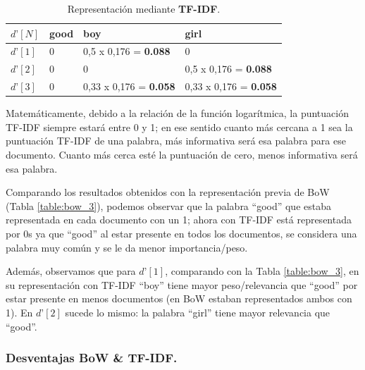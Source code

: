 \documentclass[12pt,a4paper]{article}
\begin{document}
\begin{sloppypar}
\begin{table}[h!]
\centering
\begin{tabular}{|p{1cm}||p{1cm}|p{4cm}|p{4cm}|}
\hline
\centering $d’[N]$ & \textbf{good} & \textbf{boy} & \textbf{girl}  \\ [1ex] 
\hline
$d’[1]$ & 0 & 0,5 x 0,176 = \textbf{0.088} & 0  \\
\hline
$d’[2]$ & 0 & 0 & 0,5 x 0,176 = \textbf{0.088}  \\
\hline
$d’[3]$ & 0 & 0,33 x 0,176 = \textbf{0.058} & 0,33 x 0,176 = \textbf{0.058}  \\
\hline
\end{tabular}
\caption{Representación mediante \textbf{TF-IDF}\cite{NLP_2}.} 
\label{table:tf_idf_3}
\end{table}

Matemáticamente, debido a la relación de la función logarítmica, la puntuación TF-IDF siempre estará entre 0 y 1; en ese sentido cuanto más cercana a 1 sea la puntuación TF-IDF de una palabra, más informativa será esa palabra para ese documento. Cuanto más cerca esté la puntuación de cero, menos informativa será esa palabra\cite{NLP_7}.

Comparando los resultados obtenidos con la representación previa de BoW (Tabla \ref{table:bow_3}), podemos observar que la palabra “good” que estaba representada en cada documento con un 1; ahora con TF-IDF está representada por 0s ya que “good” al estar presente en todos los documentos, se considera una palabra muy común y se le da menor importancia/peso.

Además, observamos que para $d’[1]$, comparando con la Tabla \ref{table:bow_3}, en su representación con TF-IDF “boy” tiene mayor peso/relevancia que “good” por estar presente en menos documentos (en BoW estaban representados ambos con 1). En $d’[2]$ sucede lo mismo: la palabra “girl” tiene mayor relevancia que “good”.

\subsubsection{Desventajas BoW \& TF-IDF.}\label{desv_bow_tfidf}


\end{sloppypar}
\end{document}
